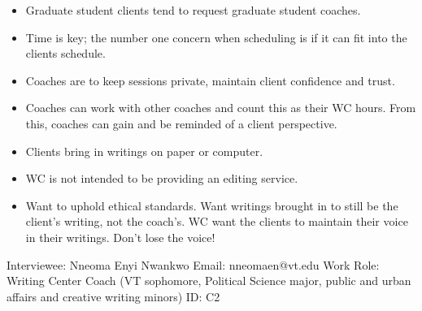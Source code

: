 \documentclass[12pt]{article} %
\begin{document}
\begin{itemize}
    \item Graduate student clients tend to request graduate student coaches.
     
    \item Time is key; the number one concern when scheduling is if it can fit into the clients schedule.
     
    \item Coaches are to keep sessions private, maintain client confidence and trust.
     
    \item Coaches can work with other coaches and count this as their WC hours.  From this, coaches can gain and be reminded of a client perspective.
     
    \item Clients bring in writings on paper or computer.
     
    \item WC is not intended to be providing an editing service.
     
    \item Want to uphold ethical standards.  Want writings brought in to still be the client’s writing, not the coach’s.  WC want the clients to maintain their voice in their writings.  Don’t lose the voice!
  \end{itemize}
  
    Interviewee: Nneoma Enyi Nwankwo
    Email: nneomaen@vt.edu
    Work Role: Writing Center Coach (VT sophomore, Political Science major, public and urban affairs and creative writing minors)
    ID: C2
    
\end{document}
